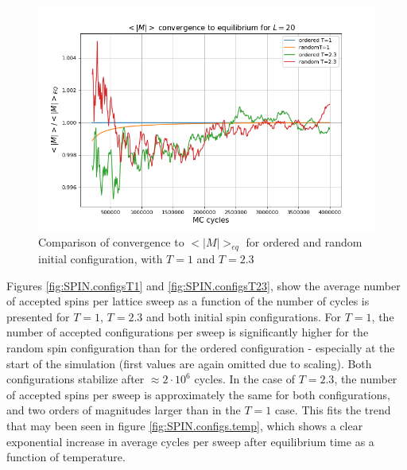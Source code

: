 \documentclass[%
oneside,                 %
final,                   %
10pt]{article}
\begin{document}
\begin{figure}[!htb]
        \centering 
         \includegraphics[scale=.55]{../Results/Mconvergence.png} 
        \caption{Comparison of convergence to $<|M|>_{eq}$ for ordered and random initial configuration, with $T=1$ and $T=2.3$}
        \label{fig:SPIN.M.convergence}   
\end{figure} 


Figures \ref{fig:SPIN.configsT1} and \ref{fig:SPIN.configsT23}, show the average number of accepted spins per lattice sweep as a function of the number of cycles is presented for $T=1$, $T=2.3$ and both initial spin configurations. For $T=1$, the number of accepted configurations per sweep is significantly higher for the random spin configuration than for the ordered configuration - especially at the start of the simulation (first values are again omitted due to scaling). Both configurations stabilize after $\approx 2 \cdot 10^6$ cycles. In the case of $T=2.3$, the number of accepted spins per sweep is approximately the same for both configurations, and two orders of magnitudes larger than in the $T=1$ case. This fits the trend that may been seen in figure \ref{fig:SPIN.configs.temp}, which shows a clear exponential increase in average cycles per sweep after equilibrium time as a function of temperature.
\end{document}
